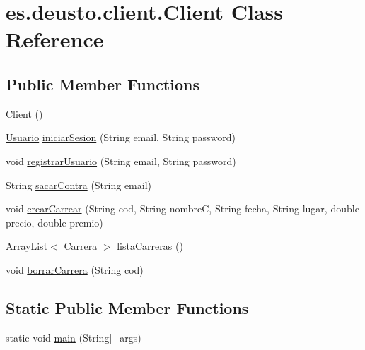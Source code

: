 \hypertarget{classes_1_1deusto_1_1client_1_1_client}{}\section{es.\+deusto.\+client.\+Client Class Reference}
\label{classes_1_1deusto_1_1client_1_1_client}
\subsection*{Public Member Functions}
\begin{DoxyCompactItemize}
\item 
\mbox{\hyperlink{classes_1_1deusto_1_1client_1_1_client_a71c03e318a72447da873297f3364f67f}{Client}} ()
\item 
\mbox{\hyperlink{classes_1_1deusto_1_1server_1_1jdo_1_1_usuario}{Usuario}} \mbox{\hyperlink{classes_1_1deusto_1_1client_1_1_client_a4cc1480125fa35b37c37e8e1e79d91f6}{iniciar\+Sesion}} (String email, String password)
\item 
void \mbox{\hyperlink{classes_1_1deusto_1_1client_1_1_client_a6f2674bcf110140f6a0c146f95c7e182}{registrar\+Usuario}} (String email, String password)
\item 
String \mbox{\hyperlink{classes_1_1deusto_1_1client_1_1_client_a6ce290f27e4f39f9493799cbc6112cc5}{sacar\+Contra}} (String email)
\item 
void \mbox{\hyperlink{classes_1_1deusto_1_1client_1_1_client_a0efc9ad350a61ae5277827eb1964b890}{crear\+Carrear}} (String cod, String nombreC, String fecha, String lugar, double precio, double premio)
\item 
Array\+List$<$ \mbox{\hyperlink{classes_1_1deusto_1_1server_1_1jdo_1_1_carrera}{Carrera}} $>$ \mbox{\hyperlink{classes_1_1deusto_1_1client_1_1_client_abf1f982fbf3beeaba8bdcf66a50cb489}{lista\+Carreras}} ()
\item 
void \mbox{\hyperlink{classes_1_1deusto_1_1client_1_1_client_aff43677afc5d700af05c4cd6df9abd67}{borrar\+Carrera}} (String cod)
\end{DoxyCompactItemize}
\subsection*{Static Public Member Functions}
\begin{DoxyCompactItemize}
\item 
static void \mbox{\hyperlink{classes_1_1deusto_1_1client_1_1_client_a69a7526d0af9cb2341f4bf341b501152}{main}} (String\mbox{[}$\,$\mbox{]} args)
\end{DoxyCompactItemize}


